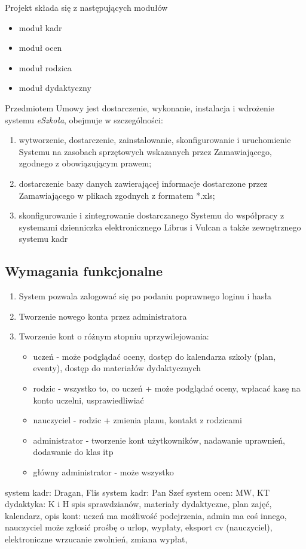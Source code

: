 \documentclass{article}
\begin{document}
Projekt składa się z następujących modułów
\begin{itemize}
    \item moduł kadr
    \item moduł ocen
    \item moduł rodzica
    \item moduł dydaktyczny
\end{itemize}

Przedmiotem Umowy jest dostarczenie, wykonanie, instalacja i wdrożenie systemu \textit{eSzkoła}, obejmuje w szczególności:
\begin{enumerate}
    \item wytworzenie, dostarczenie, zainstalowanie, skonfigurowanie i uruchomienie Systemu na zasobach sprzętowych wskazanych przez Zamawiającego, zgodnego z obowiązującym
    prawem;
    \item dostarczenie bazy danych zawierającej informacje dostarczone przez Zamawiającego w plikach zgodnych z formatem *.xls;
    \item skonfigurowanie i zintegrowanie dostarczanego Systemu do współpracy z systemami dzienniczka elektronicznego Librus i Vulcan
    a także zewnętrznego systemu kadr %
\end{enumerate}

\subsection{Wymagania funkcjonalne}
\begin{enumerate}
    \item System pozwala zalogować się po podaniu poprawnego loginu i hasła
    \item Tworzenie nowego konta przez administratora
    \item Tworzenie kont o różnym stopniu uprzywilejowania: 
    \begin{itemize}
        \item uczeń - może podglądać oceny, dostęp do kalendarza szkoły (plan, eventy), dostęp do materiałów dydaktycznych
        \item rodzic - wszystko to, co uczeń + może podglądać oceny, wpłacać kasę na konto uczelni, usprawiedliwiać
        \item nauczyciel - rodzic + zmienia planu, kontakt z rodzicami
        \item administrator - tworzenie kont użytkowników, nadawanie uprawnień, dodawanie do klas itp
        \item główny administrator - może wszystko
    \end{itemize}
\end{enumerate}
system kadr: Dragan, Flis
system kadr: Pan Szef
system ocen: MW, KT
dydaktyka: K i H spis sprawdzianów, materiały dydaktyczne, plan zajęć, kalendarz, opis kont: uczeń ma możliwość podejrzenia, admin ma coś innego, nauczyciel może zgłosić prośbę o urlop, wypłaty, eksport cv (nauczyciel), elektroniczne wrzucanie zwolnień, zmiana wypłat, 
\end{document}
